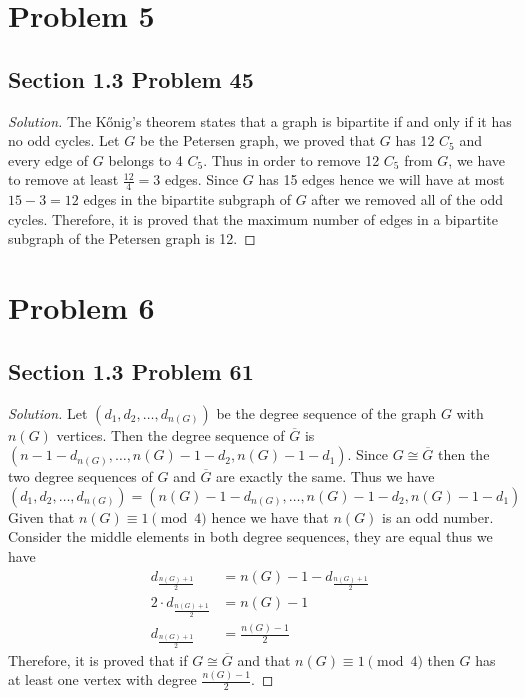 \documentclass[12pt]{article}
\newenvironment*{solution}{\begin{proof}[Solution]}{\end{proof}}
\begin{document}
\section*{Problem 5}
\subsection*{Section 1.3 Problem 45}
\begin{solution}
    The Kőnig's theorem states that a graph is bipartite if and only if it has
    no odd cycles. Let \(G\) be the Petersen graph, we proved that \(G\) has
    12 \(C_5\) and every edge of \(G\) belongs to 4 \(C_5\). Thus in order to
    remove 12 \(C_5\) from \(G\), we have to remove at least \(\frac{12}{4}=3
    \) edges. Since \(G\) has 15 edges hence we will have at most \(15-3=12\)
    edges in the bipartite subgraph of \(G\) after we removed all of the odd
    cycles. Therefore, it is proved that the maximum number of edges in a
    bipartite subgraph of the Petersen graph is 12.
\end{solution}
\section*{Problem 6}
\subsection*{Section 1.3 Problem 61}
\begin{solution}
    Let \((d_1,d_2,\dots,d_{n(G)})\) be the degree sequence of the graph \(G\)
    with \(n(G)\) vertices. Then the degree sequence of \(\overline{G}\) is \(
    (n-1-d_{n(G)},\dots,n(G)-1-d_2,n(G)-1-d_1)\). Since \(G\cong\overline{G}\)
    then the two degree sequences of \(G\) and \(\overline{G}\) are exactly
    the same. Thus we have \[(d_1,d_2,\dots,d_{n(G)})=(n(G)-1-d_{n(G)},\dots,
    n(G)-1-d_2,n(G)-1-d_1)\] Given that \(n(G)\equiv1\pmod4\) hence we have
    that \(n(G)\) is an odd number. Consider the middle elements in both
    degree sequences, they are equal thus we have
    \begin{align*}
        d_{\frac{n(G)+1}{2}} &= n(G)-1-d_{\frac{n(G)+1}{2}} \\ 2\cdot
        d_{\frac{n(G)+1}{2}} &= n(G)-1 \\ d_{\frac{n(G)+1}{2}} &= 
        \frac{n(G)-1}{2}
    \end{align*}
    Therefore, it is proved that if \(G\cong\overline{G}\) and that \(n(G)
    \equiv1\pmod4\) then \(G\) has at least one vertex with degree
    \(\frac{n(G)-1}{2}\).
\end{solution}
\end{document}

